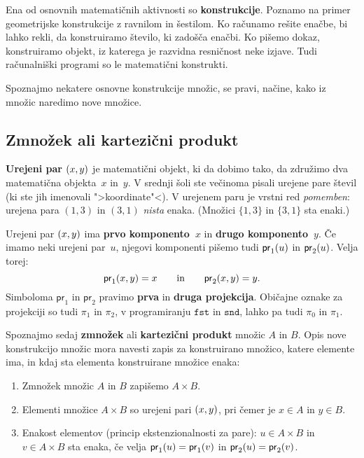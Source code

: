 Ena od osnovnih matematičnih aktivnosti so \textbf{konstrukcije}. Poznamo na primer geometrijske konstrukcije z ravnilom in šestilom. Ko računamo rešite enačbe, bi lahko rekli, da konstruiramo število, ki zadošča enačbi. Ko pišemo dokaz, konstruiramo objekt, iz katerega je razvidna resničnost neke izjave. Tudi računalniški programi so le matematični konstrukti.

Spoznajmo nekatere osnovne konstrukcije množic, se pravi, načine, kako iz množic naredimo nove množice.

\subsection{Zmnožek ali kartezični produkt}

\textbf{Urejeni par} $(x,y)$ je matematični objekt, ki da dobimo tako, da združimo dva matematična objekta~$x$ in~$y$. V srednji šoli ste večinoma pisali urejene pare števil (ki ste jih imenovali ">koordinate"<). V urejenem paru je vrstni red \emph{pomemben}: urejena para $(1, 3)$ in $(3, 1)$ \emph{nista} enaka. (Množici $\{1, 3\}$ in $\{3, 1\}$ sta enaki.)

Urejeni par $(x, y)$ ima \textbf{prvo komponento~$x$} in \textbf{drugo komponento~$y$}. Če imamo neki urejeni par~$u$, njegovi komponenti pišemo tudi $\mathsf{pr}_1(u)$ in $\mathsf{pr}_2(u)$. Velja torej:
%
\begin{equation*}
    \mathsf{pr}_1(x,y) = x
    \qquad\text{in}\qquad
    \mathsf{pr}_2(x,y) = y.  
\end{equation*}
%
Simboloma $\mathsf{pr}_1$ in $\mathsf{pr}_2$ pravimo \textbf{prva} in \textbf{druga projekcija}. Običajne oznake za projekciji so tudi $\pi_1$ in $\pi_2$, v
programiranju $\mathtt{fst}$ in $\mathtt{snd}$, lahko pa tudi $\pi_0$ in $\pi_1$.

Spoznajmo sedaj \textbf{zmnožek} ali \textbf{kartezični produkt} množic $A$ in $B$. Opis nove konstrukcijo množic mora navesti zapis za konstruirano množico, katere elemente ima, in kdaj sta elementa konstruirane množice enaka:
%
\begin{enumerate}
\item Zmnožek množic $A$ in $B$ zapišemo $A \times B$.
\item Elementi množice $A \times B$ so urejeni pari $(x, y)$, pri čemer je $x \in A$ in $y \in B$.
\item Enakost elementov (princip ekstenzionalnosti za pare): $u \in A \times B$ in $v \in A \times B$ sta enaka, če velja $\mathsf{pr}_1(u) = \mathsf{pr}_1(v)$ in $\mathsf{pr}_2(u) = \mathsf{pr}_2(v)$.
\end{enumerate}


